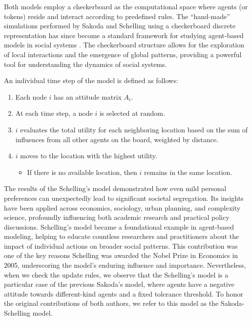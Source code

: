 Both models employ a checkerboard as the computational space where agents (or tokens) reside and interact according to predefined rules. The ``hand-made'' simulations performed by Sakoda and Schelling using a checkerboard discrete representation has since become a standard framework for studying agent-based models in social systems \cite{hegselmann-2017}. The checkerboard structure allows for the exploration of local interactions and the emergence of global patterns, providing a powerful tool for understanding the dynamics of social systems.

\begin{theorem}
    An individual time step of the model is defined as follows:
    \begin{enumerate}
        \item Each node $i$ has an attitude matrix $A_i$.
        \item At each time step, a node $i$ is selected at random.
        \item $i$ evaluates the total utility for each neighboring location based on the sum of influences from all other agents on the board, weighted by distance.
        \item $i$ moves to the location with the highest utility.
        \begin{itemize}
            \item If there is no available location, then $i$ remains in the same location.
        \end{itemize}
    \end{enumerate}
\end{theorem}

The results of the Schelling's model demonstrated how even mild personal preferences can unexpectedly lead to significant societal segregation. Its insights have been applied across economics, sociology, urban planning, and complexity science, profoundly influencing both academic research and practical policy discussions. Schelling's model became a foundational example in agent-based modeling, helping to educate countless researchers and practitioners about the impact of individual actions on broader social patterns. This contribution was one of the key reasons Schelling was awarded the Nobel Prize in Economics in 2005, underscoring the model's enduring influence and importance. Nevertheless, when we check the update rules, we observe that the Schelling's model is a particular case of the previous Sakoda's model, where agents have a negative attitude towards different-kind agents and a fixed tolerance threshold. To honor the original contributions of both authors, we refer to this model as the Sakoda-Schelling model.

